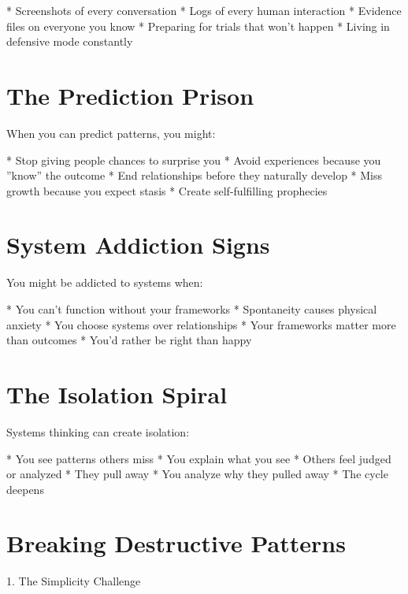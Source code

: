 \documentclass[12pt,oneside]{book}
\begin{document}
                    * Screenshots of every conversation
                    * Logs of every human interaction
                    * Evidence files on everyone you know
                    * Preparing for trials that won't happen
                    * Living in defensive mode constantly

\section{The Prediction Prison}

When you can predict patterns, you might:

                    * Stop giving people chances to surprise you
                    * Avoid experiences because you ''know'' the outcome
                    * End relationships before they naturally develop
                    * Miss growth because you expect stasis
                    * Create self-fulfilling prophecies

\section{System Addiction Signs}

You might be addicted to systems when:

                    * You can't function without your frameworks
                    * Spontaneity causes physical anxiety
                    * You choose systems over relationships
                    * Your frameworks matter more than outcomes
                    * You'd rather be right than happy

\section{The Isolation Spiral}

Systems thinking can create isolation:

                    * You see patterns others miss
                    * You explain what you see
                    * Others feel judged or analyzed
                    * They pull away
                    * You analyze why they pulled away
                    * The cycle deepens

\section{Breaking Destructive Patterns}

                1. The Simplicity Challenge
\end{document}
